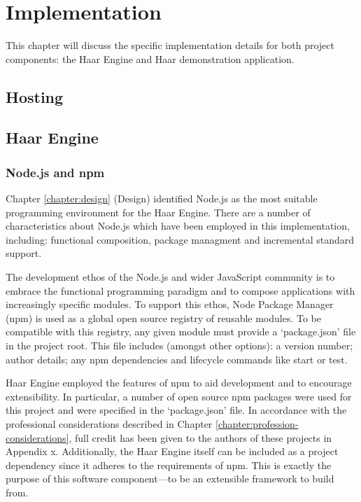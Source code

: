 \chapter{Implementation}
  This chapter will discuss the specific implementation details for both project components: the Haar Engine and Haar demonstration application.

  \section{Hosting}


  \section{Haar Engine}

    \subsection{Node.js and npm}
      Chapter \ref{chapter:design} (Design) identified Node.js as the most suitable programming environment for the Haar Engine. There are a number of characteristics  about Node.js which have been employed in this implementation, including: functional composition, package managment and incremental standard support.

      The development ethos of the Node.js and wider JavaScript community is to embrace the functional programming paradigm and to compose applications with increasingly specific modules. To support this ethos, Node Package Manager (npm) is used as a global open source registry of reusable modules. To be compatible with this registry, any given module must provide a `package.json' file in the project root. This file includes (amongst other options): a version number; author details; any npm dependencies and lifecycle commands like start or test.

      Haar Engine employed the features of npm to aid development and to encourage extensibility. In particular, a number of open source npm packages were used for this project and were specified in the `package.json' file. In accordance with the professional considerations described in Chapter \ref{chapter:profession-considerations}, full credit has been given to the authors of these projects in Appendix x. Additionally, the Haar Engine itself can be included as a project dependency since it adheres to the requirements of npm. This is exactly the purpose of this software component---to be an extensible framework to build from.

